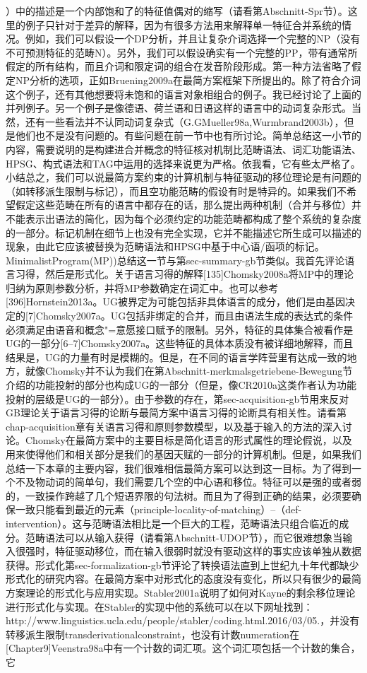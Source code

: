 ）中的描述是一个内部饱和了的特征值偶对的缩写（请看第Abschnitt-Spr节）。这里的例子只针对于差异的解释，因为有很多方法用来解释单一特征合并系统的情况。例如，我们可以假设一个DP分析，并且让复杂介词选择一个完整的NP（没有不可预测特征的范畴N）。另外，我们可以假设确实有一个完整的PP，带有通常所假定的所有结构，而且介词和限定词的组合在发音阶段形成。第一种方法省略了假定NP分析的选项，正如Bruening2009a在最简方案框架下所提出的。除了符合介词这个例子，还有其他想要将未饱和的语言对象相组合的例子。我已经讨论了上面的并列例子。另一个例子是像德语、荷兰语和日语这样的语言中的动词复杂形式。当然，还有一些看法并不认同动词复杂式（G.GMueller98a,Wurmbrand2003b），但是他们也不是没有问题的。有些问题在前一节中也有所讨论。简单总结这一小节的内容，需要说明的是构建进合并概念的特征核对机制比范畴语法、词汇功能语法、HPSG、构式语法和TAG中运用的选择来说更为严格。依我看，它有些太严格了。小结总之，我们可以说最简方案约束的计算机制与特征驱动的移位理论是有问题的（如转移派生限制与标记），而且空功能范畴的假设有时是特异的。如果我们不希望假定这些范畴在所有的语言中都存在的话，那么提出两种机制（合并与移位）并不能表示出语法的简化，因为每个必须约定的功能范畴都构成了整个系统的复杂度的一部分。标记机制在细节上也没有完全实现，它并不能描述它所生成可以描述的现象，由此它应该被替换为范畴语法和HPSG中基于中心语/函项的标记。MinimalistProgram(MP))总结这一节与第sec-summary-gb节类似。我首先评论语言习得，然后是形式化。关于语言习得的解释[135]Chomsky2008a将MP中的理论归纳为原则参数分析，并将MP参数确定在词汇中。也可以参考[396]Hornstein2013a。UG被界定为可能包括非具体语言的成分，他们是由基因决定的[7]Chomsky2007a。UG包括非绑定的合并，而且由语法生成的表达式的条件必须满足由语音和概念"=意愿接口赋予的限制。另外，特征的具体集合被看作是UG的一部分[6--7]Chomsky2007a。这些特征的具体本质没有被详细地解释，而且结果是，UG的力量有时是模糊的。但是，在不同的语言学阵营里有达成一致的地方，就像Chomsky并不认为我们在第Abschnitt-merkmalsgetriebene-Bewegung节介绍的功能投射的部分也构成UG的一部分（但是，像CR2010a这类作者认为功能投射的层级是UG的一部分）。由于参数的存在，第sec-acquisition-gb节用来反对GB理论关于语言习得的论断与最简方案中语言习得的论断具有相关性。请看第chap-acquisition章有关语言习得和原则参数模型，以及基于输入的方法的深入讨论。Chomsky在最简方案中的主要目标是简化语言的形式属性的理论假说，以及用来使得他们和相关部分是我们的基因天赋的一部分的计算机制。但是，如果我们总结一下本章的主要内容，我们很难相信最简方案可以达到这一目标。为了得到一个不及物动词的简单句，我们需要几个空的中心语和移位。特征可以是强的或者弱的，一致操作跨越了几个短语界限的句法树。而且为了得到正确的结果，必须要确保一致只能看到最近的元素（principle-locality-of-matching）--（def-intervention）。这与范畴语法相比是一个巨大的工程，范畴语法只组合临近的成分。范畴语法可以从输入获得（请看第Abschnitt-UDOP节），而它很难想象当输入很强时，特征驱动移位，而在输入很弱时就没有驱动这样的事实应该单独从数据获得。形式化第sec-formalization-gb节评论了转换语法直到上世纪九十年代都缺少形式化的研究内容。在最简方案中对形式化的态度没有变化，所以只有很少的最简方案理论的形式化与应用实现。Stabler2001a说明了如何对Kayne的剩余移位理论进行形式化与实现。在Stabler的实现中他的系统可以在以下网址找到：http://www.linguistics.ucla.edu/people/stabler/coding.html.2016/03/05.，并没有转移派生限制transderivationalconstraint，也没有计数numeration在[Chapter9]Veenstra98a中有一个计数的词汇项。这个词汇项包括一个计数的集合，它